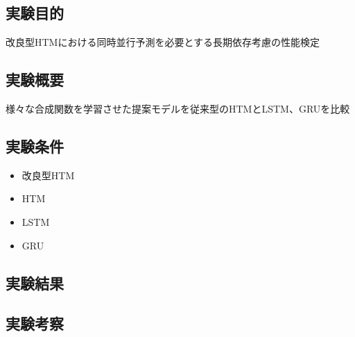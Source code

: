 \subsection{実験目的}
改良型HTMにおける同時並行予測を必要とする長期依存考慮の性能検定

\subsection{実験概要}
様々な合成関数を学習させた提案モデルを従来型のHTMとLSTM、GRUを比較

\subsection{実験条件}

\begin{itemize}
  \item 改良型HTM
  \item HTM
  \item LSTM
  \item GRU
\end{itemize}

\subsection{実験結果}
\subsection{実験考察}
